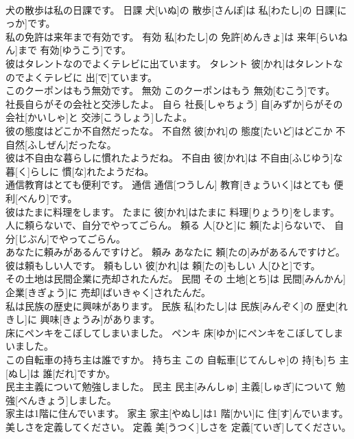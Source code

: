 \documentclass[8pt]{extreport}
\begin{document}
\begin{CJK}{UTF8}{min}
\\	犬の散歩は私の日課です。	日課	犬[いぬ]の 散歩[さんぽ]は 私[わたし]の 日課[にっか]です。	
\\	私の免許は来年まで有効です。	有効	私[わたし]の 免許[めんきょ]は 来年[らいねん]まで 有効[ゆうこう]です。	
\\	彼はタレントなのでよくテレビに出ています。	タレント	彼[かれ]はタレントなのでよくテレビに 出[で]ています。	
\\	このクーポンはもう無効です。	無効	このクーポンはもう 無効[むこう]です。	
\\	社長自らがその会社と交渉したよ。	自ら	社長[しゃちょう] 自[みずか]らがその 会社[かいしゃ]と 交渉[こうしょう]したよ。	
\\	彼の態度はどこか不自然だったな。	不自然	彼[かれ]の 態度[たいど]はどこか 不自然[ふしぜん]だったな。	
\\	彼は不自由な暮らしに慣れたようだね。	不自由	彼[かれ]は 不自由[ふじゆう]な 暮[く]らしに 慣[な]れたようだね。	
\\	通信教育はとても便利です。	通信	通信[つうしん] 教育[きょういく]はとても 便利[べんり]です。	
\\	彼はたまに料理をします。	たまに	彼[かれ]はたまに 料理[りょうり]をします。	
\\	人に頼らないで、自分でやってごらん。	頼る	人[ひと]に 頼[たよ]らないで、 自分[じぶん]でやってごらん。	
\\	あなたに頼みがあるんですけど。	頼み	あなたに 頼[たの]みがあるんですけど。	
\\	彼は頼もしい人です。	頼もしい	彼[かれ]は 頼[たの]もしい 人[ひと]です。	
\\	その土地は民間企業に売却されたんだ。	民間	その 土地[とち]は 民間[みんかん] 企業[きぎょう]に 売却[ばいきゃく]されたんだ。	
\\	私は民族の歴史に興味があります。	民族	私[わたし]は 民族[みんぞく]の 歴史[れきし]に 興味[きょうみ]があります。	
\\	床にペンキをこぼしてしまいました。	ペンキ	床[ゆか]にペンキをこぼしてしまいました。	
\\	この自転車の持ち主は誰ですか。	持ち主	この 自転車[じてんしゃ]の 持[も]ち 主[ぬし]は 誰[だれ]ですか。	
\\	民主主義について勉強しました。	民主	民主[みんしゅ] 主義[しゅぎ]について 勉強[べんきょう]しました。	
\\	家主は1階に住んでいます。	家主	家主[やぬし]は1 階[かい]に 住[す]んでいます。	
\\	美しさを定義してください。	定義	美[うつく]しさを 定義[ていぎ]してください。	

\end{CJK}
\end{document}
